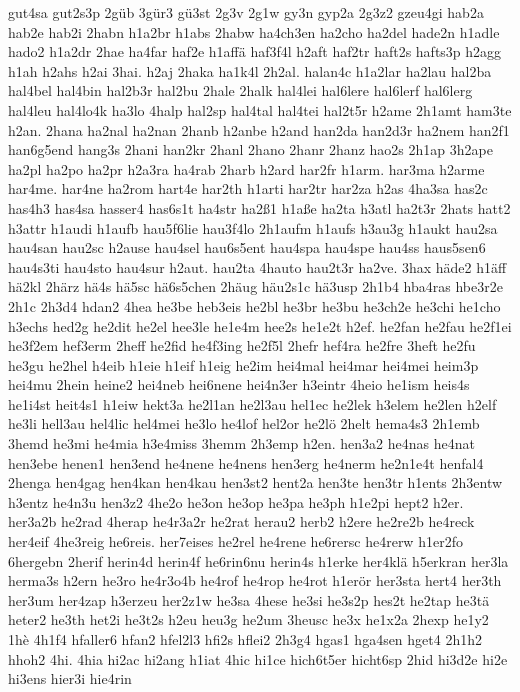 {gut4sa
gut2s3p
2güb
3gür3
gü3st
2g3v
2g1w
gy3n
gyp2a
2g3z2
gzeu4gi
hab2a
hab2e
hab2i
2habn
h1a2br
h1abs
2habw
ha4ch3en
ha2cho
ha2del
hade2n
h1adle
hado2
h1a2dr
2hae
ha4far
haf2e
h1affä
haf3f4l
h2aft
haf2tr
haft2s
hafts3p
h2agg
h1ah
h2ahs
h2ai
3hai.
h2aj
2haka
ha1k4l
2h2al.
halan4c
h1a2lar
ha2lau
hal2ba
hal4bel
hal4bin
hal2b3r
hal2bu
2hale
2halk
hal4lei
hal6lere
hal6lerf
hal6lerg
hal4leu
hal4lo4k
ha3lo
4halp
hal2sp
hal4tal
hal4tei
hal2t5r
h2ame
2h1amt
ham3te
h2an.
2hana
ha2nal
ha2nan
2hanb
h2anbe
h2and
han2da
han2d3r
ha2nem
han2f1
han6g5end
hang3s
2hani
han2kr
2hanl
2hano
2hanr
2hanz
hao2s
2h1ap
3h2ape
ha2pl
ha2po
ha2pr
h2a3ra
ha4rab
2harb
h2ard
har2fr
h1arm.
har3ma
h2arme
har4me.
har4ne
ha2rom
hart4e
har2th
h1arti
har2tr
har2za
h2as
4ha3sa
has2c
has4h3
has4sa
hasser4
has6s1t
ha4str
ha2ß1
h1aße
ha2ta
h3atl
ha2t3r
2hats
hatt2
h3attr
h1audi
h1aufb
hau5f6lie
hau3f4lo
2h1aufm
h1aufs
h3au3g
h1aukt
hau2sa
hau4san
hau2sc
h2ause
hau4sel
hau6s5ent
hau4spa
hau4spe
hau4ss
haus5sen6
hau4s3ti
hau4sto
hau4sur
h2aut.
hau2ta
4hauto
hau2t3r
ha2ve.
3hax
häde2
h1äff
hä2kl
2härz
hä4s
hä5sc
hä6s5chen
2häug
häu2s1c
hä3usp
2h1b4
hba4ras
hbe3r2e
2h1c
2h3d4
hdan2
4hea
he3be
heb3eis
he2bl
he3br
he3bu
he3ch2e
he3chi
he1cho
h3echs
hed2g
he2dit
he2el
hee3le
he1e4m
hee2s
he1e2t
h2ef.
he2fan
he2fau
he2f1ei
he3f2em
hef3erm
2heff
he2fid
he4f3ing
he2f5l
2hefr
hef4ra
he2fre
3heft
he2fu
he3gu
he2hel
h4eib
h1eie
h1eif
h1eig
he2im
hei4mal
hei4mar
hei4mei
heim3p
hei4mu
2hein
heine2
hei4neb
hei6nene
hei4n3er
h3eintr
4heio
he1ism
heis4s
he1i4st
heit4s1
h1eiw
hekt3a
he2l1an
he2l3au
hel1ec
he2lek
h3elem
he2len
h2elf
he3li
hell3au
hel4lic
hel4mei
he3lo
he4lof
hel2or
he2lö
2helt
hema4s3
2h1emb
3hemd
he3mi
he4mia
h3e4miss
3hemm
2h3emp
h2en.
hen3a2
he4nas
he4nat
hen3ebe
henen1
hen3end
he4nene
he4nens
hen3erg
he4nerm
he2n1e4t
henfal4
2henga
hen4gag
hen4kan
hen4kau
hen3st2
hent2a
hen3te
hen3tr
h1ents
2h3entw
h3entz
he4n3u
hen3z2
4he2o
he3on
he3op
he3pa
he3ph
h1e2pi
hept2
h2er.
her3a2b
he2rad
4herap
he4r3a2r
he2rat
herau2
herb2
h2ere
he2re2b
he4reck
her4eif
4he3reig
he6reis.
her7eises
he2rel
he4rene
he6rersc
he4rerw
h1er2fo
6hergebn
2herif
herin4d
herin4f
he6rin6nu
herin4s
h1erke
her4klä
h5erkran
her3la
herma3s
h2ern
he3ro
he4r3o4b
he4rof
he4rop
he4rot
h1erör
her3sta
hert4
her3th
her3um
her4zap
h3erzeu
her2z1w
he3sa
4hese
he3si
he3s2p
hes2t
he2tap
he3tä
heter2
he3th
het2i
he3t2s
h2eu
heu3g
he2um
3heusc
he3x
he1x2a
2hexp
he1y2
1hè
4h1f4
hfaller6
hfan2
hfel2l3
hfi2s
hflei2
2h3g4
hgas1
hga4sen
hget4
2h1h2
hhoh2
4hi.
4hia
hi2ac
hi2ang
h1iat
4hic
hi1ce
hich6t5er
hicht6sp
2hid
hi3d2e
hi2e
hi3ens
hier3i
hie4rin
}
